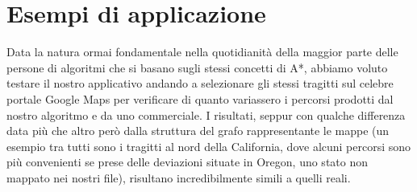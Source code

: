 \documentclass[12pt,a4paper]{report}
\begin{document}
\chapter{Esempi di applicazione}

Data la natura ormai fondamentale nella quotidianità della maggior parte delle persone di algoritmi che si basano sugli stessi concetti di A*, abbiamo voluto testare il nostro applicativo andando a selezionare gli stessi tragitti sul celebre portale Google Maps per verificare di quanto variassero i percorsi prodotti dal nostro algoritmo e da uno commerciale. I risultati, seppur con qualche differenza data più che altro però dalla struttura del grafo rappresentante le mappe (un esempio tra tutti sono i tragitti al nord della California, dove alcuni percorsi sono più convenienti se prese delle deviazioni situate in Oregon, uno stato non mappato nei nostri file), risultano incredibilmente simili a quelli reali.
\end{document}
